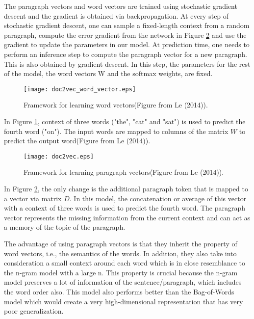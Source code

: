 The paragraph vectors and word vectors are trained using stochastic gradient descent and the gradient is obtained via backpropagation.  At every step of stochastic gradient descent, one can sample a fixed-length context from a random paragraph, compute the error gradient from the network in Figure \ref{fig:doc2vec} and use the gradient to update the parameters in our model. At prediction time, one needs to perform an inference step to compute the paragraph vector for a new paragraph. This is also obtained by gradient descent.  In this step, the parameters for the rest of the model, the word vectors W
and the softmax weights, are fixed.

\begin{figure}[ht!]
\centering
\texttt{[image: doc2vec\_word\_vector.eps]}
\caption{Framework for learning word vectors(Figure from Le (2014)). \label{fig:word2vec}}
\end{figure}
In Figure \ref{fig:word2vec}, context  of three words ("the", "cat" and "sat") is used to predict the fourth word ("on"). The input words are mapped to columns of the matrix $W$ to predict the output word(Figure from Le (2014)).

\begin{figure}[ht!]
\centering
\texttt{[image: doc2vec.eps]}
\caption{Framework for learning paragraph vectors(Figure from Le (2014)). \label{fig:doc2vec}}
\end{figure}
In Figure \ref{fig:doc2vec}, the only change is the additional paragraph token that is mapped to a vector via matrix $D$. In this model, the concatenation or average of this vector with a context of three words is used to predict the fourth word. The paragraph vector represents the missing information from the current context and can act as a memory of the topic of the paragraph.

The advantage of using paragraph vectors is that they inherit the property of word vectors, i.e., the semantics of the words. In addition, they also take into consideration a small context around each word which is in close resemblance to the n-gram model with a large n. This property is crucial because the n-gram model preserves a lot of information of the sentence/paragraph, which includes the word order also. This model also performs better than the Bag-of-Words model which would create a very high-dimensional representation that has very poor generalization.

